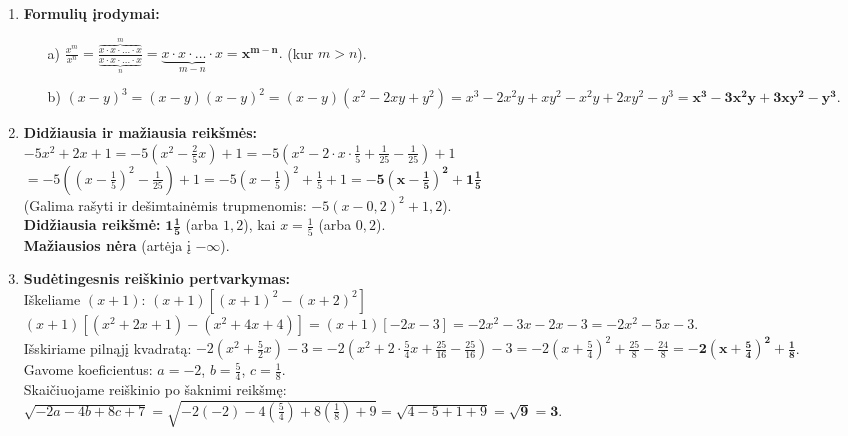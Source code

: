 \documentclass[12pt,a4paper]{article}
\begin{document}
\begin{enumerate}
    \vspace{0.3cm}
    \item \textbf{Formulių įrodymai:}
    \begin{itemize}
        \item[a)] $\frac{x^m}{x^n} = \frac{\overbrace{x \cdot x \cdot \dots \cdot x}^{m}}{\underbrace{x \cdot x \cdot \dots \cdot x}_{n}} = \underbrace{x \cdot x \cdot \dots \cdot x}_{m-n} = \mathbf{x^{m-n}}.$ (kur $m > n$).
        \item[b)] $(x-y)^3 = (x-y)(x-y)^2 = (x-y)(x^2 - 2xy + y^2) = x^3 - 2x^2y + xy^2 - x^2y + 2xy^2 - y^3 = \mathbf{x^3 - 3x^2y + 3xy^2 - y^3}.$
    \end{itemize}

    \vspace{0.3cm}
    \item \textbf{Didžiausia ir mažiausia reikšmės:} \\
    $-5x^2 + 2x + 1 = -5\left(x^2 - \frac{2}{5}x\right) + 1 = -5\left(x^2 - 2 \cdot x \cdot \frac{1}{5} + \frac{1}{25} - \frac{1}{25}\right) + 1$ \\
    $= -5\left(\left(x - \frac{1}{5}\right)^2 - \frac{1}{25}\right) + 1 = -5\left(x - \frac{1}{5}\right)^2 + \frac{1}{5} + 1 = \mathbf{-5\left(x - \frac{1}{5}\right)^2 + 1\frac{1}{5}}$ \\
    (Galima rašyti ir dešimtainėmis trupmenomis: $-5(x - 0,2)^2 + 1,2$). \\
    \textbf{Didžiausia reikšmė:} $\mathbf{1\frac{1}{5}}$ (arba $1,2$), kai $x = \frac{1}{5}$ (arba $0,2$). \\
    \textbf{Mažiausios nėra} (artėja į $-\infty$).

    \vspace{0.3cm}
    \item \textbf{Sudėtingesnis reiškinio pertvarkymas:} \\
    Iškeliame $(x+1)$: $(x+1)\left[ (x+1)^2 - (x+2)^2 \right]$ \\
    $(x+1) [ (x^2 + 2x + 1) - (x^2 + 4x + 4) ] = (x+1)[ -2x - 3 ] = -2x^2 - 3x - 2x - 3 = -2x^2 - 5x - 3$. \\
    Išskiriame pilnąjį kvadratą: $-2\left(x^2 + \frac{5}{2}x\right) - 3 = -2\left(x^2 + 2 \cdot \frac{5}{4}x + \frac{25}{16} - \frac{25}{16}\right) - 3 = -2\left(x + \frac{5}{4}\right)^2 + \frac{25}{8} - \frac{24}{8} = \mathbf{-2\left(x + \frac{5}{4}\right)^2 + \frac{1}{8}}$. \\
    Gavome koeficientus: $a = -2$, $b = \frac{5}{4}$, $c = \frac{1}{8}$. \\
    Skaičiuojame reiškinio po šaknimi reikšmę: \\
    $\sqrt{-2a - 4b + 8c + 7} = \sqrt{-2(-2) - 4\left(\frac{5}{4}\right) + 8\left(\frac{1}{8}\right) + 9} = \sqrt{4 - 5 + 1 + 9} = \mathbf{\sqrt{9}} = \mathbf{3}$.


\end{enumerate}
\end{document}
